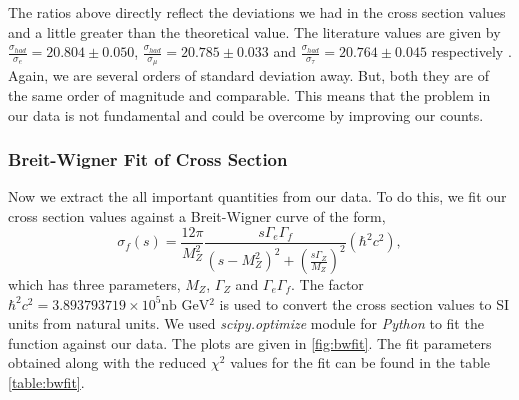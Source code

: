 The ratios above directly reflect the deviations we had in the cross section values and a little greater than the theoretical value. The literature values are given by $\frac{\sigma_{had}}{\sigma_e} = 20.804 \pm 0.050$, $\frac{\sigma_{had}}{\sigma_{\mu}} = 20.785 \pm 0.033$ and $\frac{\sigma_{had}}{\sigma_{\tau}} = 20.764 \pm 0.045$ respectively \cite{pdg2}. Again, we are several orders of standard deviation away. But, both they are of the same order of magnitude and comparable. This means that the problem in our data is not fundamental and could be overcome by improving our counts.

\subsubsection{Breit-Wigner Fit of Cross Section}
Now we extract the all important quantities from our data. To do this, we fit our cross section values against a Breit-Wigner curve of the form,
\begin{equation}
    \sigma_f (s) = \frac{12\pi}{M_Z^2} \frac{s \Gamma_e \Gamma_f}{(s-M_Z^2)^2 + \left(\frac{s\Gamma_Z}{M_Z}\right)^2} (\hbar^2 c^2),
\end{equation}
which has three parameters, $M_Z$, $\Gamma_Z$ and $\Gamma_e\Gamma_f$. The factor $\hbar^2 c^2 = 3.893793719 \times 10^5 \text{nb GeV$^2$}$ is used to convert the cross section values to SI units from natural units. We used \textit{scipy.optimize} module for \textit{Python} to fit the function against our data. The plots are given in \ref{fig:bwfit}. The fit parameters obtained along with the reduced $\chi^2$ values for the fit can be found in the table \ref{table:bwfit}.\\
